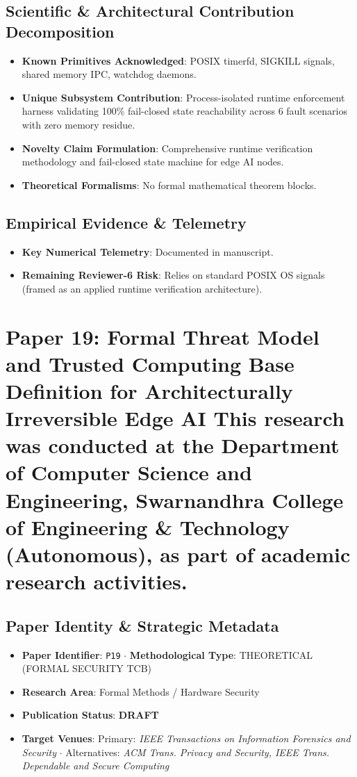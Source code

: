\documentclass[11pt,a4paper]{article}
\begin{document}
\subsection*{Scientific & Architectural Contribution Decomposition}
\begin{itemize}[leftmargin=1.5em, itemsep=0.2em]
    \item \textbf{Known Primitives Acknowledged}: POSIX timerfd, SIGKILL signals, shared memory IPC, watchdog daemons.
    \item \textbf{Unique Subsystem Contribution}: Process-isolated runtime enforcement harness validating 100\% fail-closed state reachability across 6 fault scenarios with zero memory residue.
    \item \textbf{Novelty Claim Formulation}: Comprehensive runtime verification methodology and fail-closed state machine for edge AI nodes.
    \item \textbf{Theoretical Formalisms}: No formal mathematical theorem blocks.
\end{itemize}

\subsection*{Empirical Evidence & Telemetry}
\begin{itemize}[leftmargin=1.5em, itemsep=0.2em]
    \item \textbf{Key Numerical Telemetry}: Documented in manuscript.
    \item \textbf{Remaining Reviewer-6 Risk}: Relies on standard POSIX OS signals (framed as an applied runtime verification architecture).
\end{itemize}

\section{Paper 19: Formal Threat Model and Trusted Computing Base Definition for Architecturally Irreversible Edge AI This research was conducted at the Department of Computer Science and Engineering, Swarnandhra College of Engineering \& Technology (Autonomous), as part of academic research activities.}

\subsection*{Paper Identity \& Strategic Metadata}
\begin{itemize}[leftmargin=1.5em, itemsep=0.2em]
    \item \textbf{Paper Identifier}: \texttt{P19} $\cdot$ \textbf{Methodological Type}: THEORETICAL (FORMAL SECURITY TCB)
    \item \textbf{Research Area}: Formal Methods / Hardware Security
    \item \textbf{Publication Status}: \textbf{DRAFT}
    \item \textbf{Target Venues}: Primary: \textit{IEEE Transactions on Information Forensics and Security} $\cdot$ Alternatives: \textit{ACM Trans. Privacy and Security, IEEE Trans. Dependable and Secure Computing}
\end{itemize}
\end{document}
